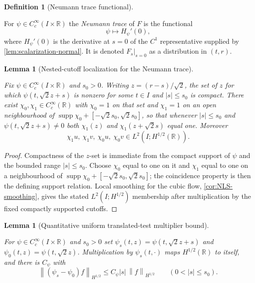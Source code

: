 \documentclass[11pt,oneside]{book}
\providecommand{\uses}[1]{}
\newtheorem{lemma}[theorem]{Lemma}
\theoremstyle{definition}
\newtheorem{definition}[theorem]{Definition}
\theoremstyle{remark}
\newcommand{\R}{\mathbb R}
\newcommand{\supp}{\operatorname{supp}}
\newcommand{\1}{\mathbf 1}
\newcommand{\norm}[1]{\left\lVert #1\right\rVert}
\newcommand{\abs}[1]{\left\lvert #1\right\rvert}
\begin{document}
\begin{definition}[Neumann trace functional]\label{def:neumann-trace}
\uses{lem:scalarization-normal, thm:local-H2-characterization}
For $\psi\in C_c^\infty(I\times\R)$ the \emph{Neumann trace} of $F$ is the
functional
\[
 \psi\longmapsto H_\psi'(0),
\]
where $H_\psi'(0)$ is the derivative at $s=0$ of the $C^1$ representative supplied
by \cref{lem:scalarization-normal}. It is denoted $F_s|_{s=0}$ as a distribution
in $(t,r)$.
\end{definition}

\begin{lemma}[Nested-cutoff localization for the Neumann trace]\label{lem:neumann-localization}
\uses{def:neumann-trace}
Fix $\psi\in C_c^\infty(I\times\R)$ and $s_0>0$. Writing $z=(r-s)/\sqrt2$, the set
of $z$ for which $\psi(t,\sqrt2z+s)$ is nonzero for some $t\in I$ and
$\abs s\le s_0$ is compact. There exist $\chi_0,\chi_1\in C_c^\infty(\R)$ with
$\chi_0=1$ on that set and $\chi_1=1$ on an open neighbourhood of
$\supp\chi_0+[-\sqrt2s_0,\sqrt2s_0]$, so that whenever $\abs s\le s_0$ and
$\psi(t,\sqrt2z+s)\ne0$ both $\chi_1(z)$ and $\chi_1(z+\sqrt2s)$ equal one.
Moreover
\[
 \chi_1u,\ \chi_1v,\ \chi_0u,\ \chi_0v\in L^2(I;H^{1/2}(\R)).
\]
\end{lemma}

\begin{proof}
\uses{cor:NLS-smoothing}
Compactness of the $z$-set is immediate from the compact support of $\psi$ and
the bounded range $\abs s\le s_0$. Choose $\chi_0$ equal to one on it and $\chi_1$
equal to one on a neighbourhood of $\supp\chi_0+[-\sqrt2s_0,\sqrt2s_0]$; the
coincidence property is then the defining support relation. Local smoothing for
the cubic flow, \cref{cor:NLS-smoothing}, gives the stated
$L^2(I;H^{1/2})$ membership after multiplication by the fixed compactly supported
cutoffs.
\end{proof}

\begin{lemma}[Quantitative uniform translated-test multiplier bound]\label{lem:translated-test-multiplier}
\uses{lem:smooth-multiplier-quantitative}
For $\psi\in C_c^\infty(I\times\R)$ and $s_0>0$ set
$\psi_s(t,z)=\psi(t,\sqrt2z+s)$ and $\psi_0(t,z)=\psi(t,\sqrt2z)$. Multiplication
by $\psi_s(t,\cdot)$ maps $H^{1/2}(\R)$ to itself, and there is $C_\psi$ with
\begin{equation}
 \norm{(\psi_s-\psi_0)f}_{H^{1/2}}\le C_\psi\abs s\,\norm f_{H^{1/2}}
 \qquad(0<\abs s\le s_0). \label{eq:translated-test-multiplier}
\end{equation}
\end{lemma}
\end{document}
